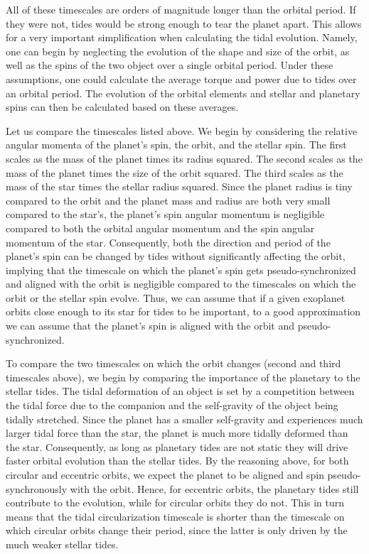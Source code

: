 All of these timescales are orders of magnitude longer than the orbital period.
If they were not, tides would be strong enough to tear the planet apart. This
allows for a very important simplification when calculating the tidal evolution.
Namely, one can begin by neglecting the evolution of the shape and size of the
orbit, as well as the spins of the two object over a single orbital period.
Under these assumptions, one could calculate the average torque and power due to
tides over an orbital period. The evolution of the orbital elements and stellar
and planetary spins can then be calculated based on these averages.

Let us compare the timescales listed above. We begin by considering the relative
angular momenta of the planet's spin, the orbit, and the stellar spin. The first
scales as the mass of the planet times its radius squared. The second scales as
the mass of the planet times the size of the orbit squared. The third scales as
the mass of the star times the stellar radius squared. Since the planet radius
is tiny compared to the orbit and the planet mass and radius are both very small
compared to the star's, the planet's spin angular momentum is negligible
compared to both the orbital angular momentum and the spin angular momentum of
the star. Consequently, both the direction and period of the planet's spin can
be changed by tides without significantly affecting the orbit, implying that the
timescale on which the planet's spin gets pseudo-synchronized and aligned with
the orbit is negligible compared to the timescales on which the orbit or the
stellar spin evolve. Thus, we can assume that if a given exoplanet orbits close
enough to its star for tides to be important, to a good approximation we can
assume that the planet's spin is aligned with the orbit and pseudo-synchronized.

To compare the two timescales on which the orbit changes (second and third
timescales above), we begin by comparing the importance of the planetary to the
stellar tides. The tidal deformation of an object is set by a competition
between the tidal force due to the companion and the self-gravity of the object
being tidally stretched. Since the planet has a smaller self-gravity and
experiences much larger tidal force than the star, the planet is much more
tidally deformed than the star. Consequently, as long as planetary tides are not
static they will drive faster orbital evolution than the stellar tides. By the
reasoning above, for both circular and eccentric orbits, we expect the planet to
be aligned and spin pseudo-synchronously with the orbit.  Hence, for eccentric
orbits, the planetary tides still contribute to the evolution, while for
circular orbits they do not. This in turn means that the tidal circularization
timescale is shorter than the timescale on which circular orbits change their
period, since the latter is only driven by the much weaker stellar tides.

